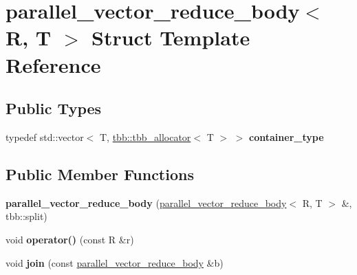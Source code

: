 \hypertarget{structparallel__vector__reduce__body}{}\section{parallel\+\_\+vector\+\_\+reduce\+\_\+body$<$ R, T $>$ Struct Template Reference}
\label{structparallel__vector__reduce__body}
\subsection*{Public Types}
\begin{DoxyCompactItemize}
\item 
\hypertarget{structparallel__vector__reduce__body_afc93635d27c004d8fe7a4232a072189e}{}typedef std\+::vector$<$ T, \hyperlink{classtbb_1_1tbb__allocator}{tbb\+::tbb\+\_\+allocator}$<$ T $>$ $>$ {\bfseries container\+\_\+type}\label{structparallel__vector__reduce__body_afc93635d27c004d8fe7a4232a072189e}

\end{DoxyCompactItemize}
\subsection*{Public Member Functions}
\begin{DoxyCompactItemize}
\item 
\hypertarget{structparallel__vector__reduce__body_ab542c62200136553ccc6052fa1cd33d1}{}{\bfseries parallel\+\_\+vector\+\_\+reduce\+\_\+body} (\hyperlink{structparallel__vector__reduce__body}{parallel\+\_\+vector\+\_\+reduce\+\_\+body}$<$ R, T $>$ \&, tbb\+::split)\label{structparallel__vector__reduce__body_ab542c62200136553ccc6052fa1cd33d1}

\item 
\hypertarget{structparallel__vector__reduce__body_a4a897fe48e3b23e7edb6b15cdd42c7ec}{}void {\bfseries operator()} (const R \&r)\label{structparallel__vector__reduce__body_a4a897fe48e3b23e7edb6b15cdd42c7ec}

\item 
\hypertarget{structparallel__vector__reduce__body_a1bb793be5319d72218ff6e462b808740}{}void {\bfseries join} (const \hyperlink{structparallel__vector__reduce__body}{parallel\+\_\+vector\+\_\+reduce\+\_\+body} \&b)\label{structparallel__vector__reduce__body_a1bb793be5319d72218ff6e462b808740}

\end{DoxyCompactItemize}
